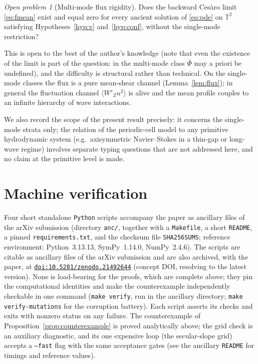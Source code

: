 \documentclass[11pt]{amsart}
\theoremstyle{definition}
\theoremstyle{remark}
\newtheorem{openproblem}[theorem]{Open problem}
\newcommand{\T}{\mathbb{T}}
\newcommand{\Fbar}{\bar\Phi}
\newcommand{\mean}[1]{\langle #1\rangle}
\begin{document}
\begin{openproblem}[Multi-mode flux rigidity]\label{op:multimode}
Does the backward Ces\`aro limit \eqref{eq:fmean} exist and equal zero
for every ancient solution of \eqref{eq:pde} on $\T^2$ satisfying
Hypotheses~\ref{hyp:v} and~\ref{hyp:conf}, without the single-mode
restriction?
\end{openproblem}

This is open to the best of the author's knowledge (note that even the
existence of the limit is part of the question: in the multi-mode class
$\Fbar$ may a priori be undefined), and the difficulty is structural
rather than technical. On the single-mode classes the flux is a pure
mean-shear channel (Lemma~\ref{lem:flux}); in general the fluctuation
channel $\mean{W'_Zu^2}$ is alive and the mean profile couples to an
infinite hierarchy of wave interactions.

We also record the scope of the present result precisely: it concerns the
single-mode strata only; the relation of the periodic-cell model to any
primitive hydrodynamic system (e.g.\ axisymmetric Navier--Stokes in a
thin-gap or long-wave regime) involves separate typing questions that
are not addressed here, and no claim at the primitive level is made.

\appendix

\section{Machine verification}\label{app:verification}

Four short standalone \texttt{Python} scripts accompany the paper as
ancillary files of the arXiv submission (directory \texttt{anc/},
together with a \texttt{Makefile}, a short \texttt{README}, a pinned
\texttt{requirements.txt}, and the checksum file \texttt{SHA256SUMS};
reference environment: Python~3.13.13, SymPy~1.14.0, NumPy~2.4.6). The
scripts are citable as ancillary files of the arXiv submission and are
also archived, with the paper, at
\href{https://doi.org/10.5281/zenodo.21492644}{\texttt{doi:10.5281/zenodo.21492644}}
(concept DOI, resolving to the latest version). None is load-bearing
for the proofs, which are complete above; they pin the computational
identities and make the counterexample independently checkable in one
command (\texttt{make verify}, run in the ancillary directory;
\texttt{make verify-mutations} for the corruption battery). Each script
asserts its checks and exits with nonzero status on any failure. The
counterexample of Proposition~\ref{prop:counterexample} is proved
analytically above; the grid check is an auxiliary diagnostic, and its
one expensive loop (the secular-slope grid) accepts a
\texttt{--fast} flag with the same acceptance gates (see the ancillary
\texttt{README} for timings and reference values).
\end{document}
